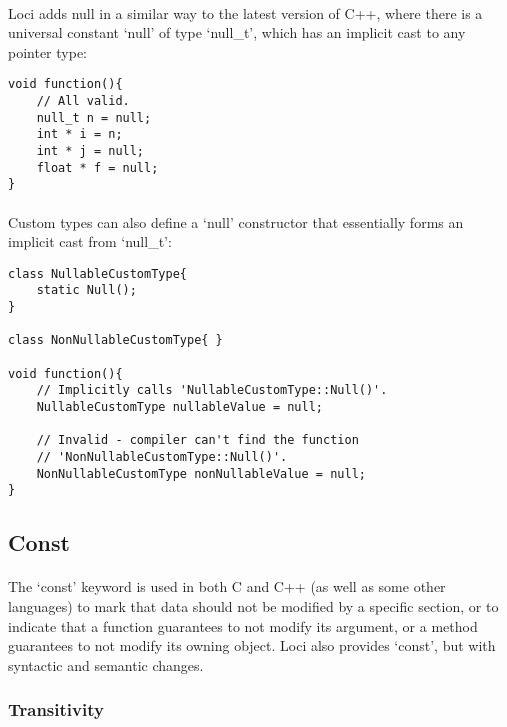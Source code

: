 \documentclass[12pt,twoside,notitlepage]{report}
\begin{document}
\paragraph{}
Loci adds null in a similar way to the latest version of C++, where there is a universal constant `null' of type `null\_t', which has an implicit cast to any pointer type:


\begin{lstlisting}
void function(){
	// All valid.
	null_t n = null;
	int * i = n;
	int * j = null;
	float * f = null;
}
\end{lstlisting}


\paragraph{}
Custom types can also define a `null' constructor that essentially forms an implicit cast from `null\_t':

\begin{lstlisting}
class NullableCustomType{
	static Null();
}

class NonNullableCustomType{ }

void function(){
	// Implicitly calls 'NullableCustomType::Null()'.
	NullableCustomType nullableValue = null;
	
	// Invalid - compiler can't find the function
	// 'NonNullableCustomType::Null()'.
	NonNullableCustomType nonNullableValue = null;
}
\end{lstlisting}

\clearpage

\subsection{Const}

\paragraph{}
The `const' keyword is used in both C and C++ (as well as some other languages) to mark that data should not be modified by a specific section, or to indicate that a function guarantees to not modify its argument, or a method guarantees to not modify its owning object. Loci also provides `const', but with syntactic and semantic changes.

\subsubsection{Transitivity}
\end{document}
